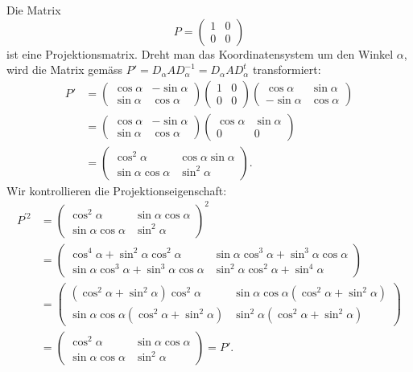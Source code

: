 \begin{beispiel}
Die Matrix
\[
P=\begin{pmatrix}1&0\\0&0\end{pmatrix}
\]
ist eine Projektionsmatrix.
Dreht man das Koordinatensystem um den Winkel $\alpha$, wird die Matrix 
gemäss $P'=D_\alpha AD_\alpha ^{-1}=D_\alpha AD_\alpha^t$ transformiert:
\begin{align*}
P'&=
\begin{pmatrix}\cos\alpha&-\sin\alpha\\\sin\alpha&\cos\alpha\end{pmatrix}
\begin{pmatrix}1&0\\0&0\end{pmatrix}
\begin{pmatrix}\cos\alpha&\sin\alpha\\-\sin\alpha&\cos\alpha\end{pmatrix}
\\
&=
\begin{pmatrix}\cos\alpha&-\sin\alpha\\\sin\alpha&\cos\alpha\end{pmatrix}
\begin{pmatrix}\cos\alpha&\sin\alpha\\0&0\end{pmatrix}
\\
&=
\begin{pmatrix}\cos^2\alpha&\cos\alpha\sin\alpha\\\sin\alpha\cos\alpha&\sin^2\alpha\end{pmatrix}.
\end{align*}
Wir kontrollieren die Projektionseigenschaft:
\begin{align*}
P^{\prime 2}
&=
\begin{pmatrix}
\cos^2\alpha
	&\sin\alpha\cos\alpha\\
\sin\alpha\cos\alpha
	&\sin^2\alpha
\end{pmatrix}^2
\\
&=
\begin{pmatrix}
\cos^4\alpha + \sin^2\alpha\cos^2\alpha
	&\sin\alpha\cos^3\alpha+\sin^3\alpha\cos\alpha\\
\sin\alpha\cos^3\alpha+\sin^3\alpha\cos\alpha
	&\sin^2\alpha\cos^2\alpha+\sin^4\alpha
\end{pmatrix}
\\
&=
\begin{pmatrix}
(\cos^2\alpha + \sin^2\alpha)\cos^2\alpha
	&\sin\alpha\cos\alpha(\cos^2\alpha+\sin^2\alpha)\\
\sin\alpha\cos\alpha(\cos^2\alpha+\sin^2\alpha)
	&\sin^2\alpha(\cos^2\alpha+\sin^2\alpha)
\end{pmatrix}
\\
&=
\begin{pmatrix}
\cos^2\alpha
	&\sin\alpha\cos\alpha\\
\sin\alpha\cos\alpha
	&\sin^2\alpha
\end{pmatrix}=P'.
\end{align*}
\end{beispiel}

